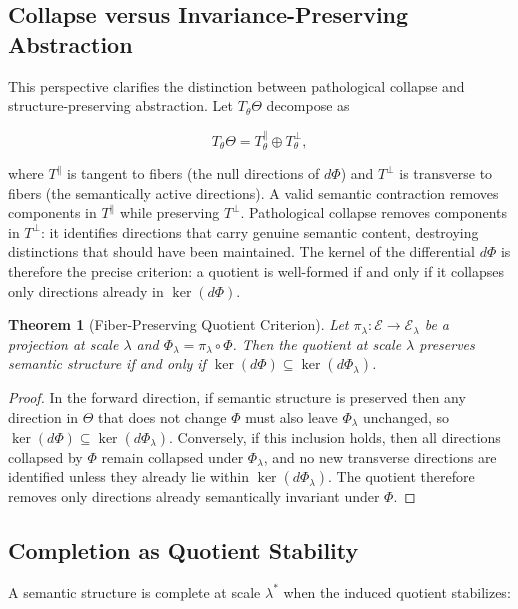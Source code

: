 \documentclass[11pt, twoside]{article}
\theoremstyle{plain}
\newtheorem{theorem}{Theorem}[section]
\theoremstyle{definition}
\theoremstyle{remark}
\begin{document}
\subsection{Collapse versus Invariance-Preserving Abstraction}

This perspective clarifies the distinction between pathological collapse and structure-preserving abstraction. Let $T_\theta \Theta$ decompose as

\[
T_\theta \Theta = T_\theta^{\parallel} \oplus T_\theta^{\perp},
\]

where $T^{\parallel}$ is tangent to fibers (the null directions of $d\Phi$) and $T^{\perp}$ is transverse to fibers (the semantically active directions). A valid semantic contraction removes components in $T^{\parallel}$ while preserving $T^{\perp}$. Pathological collapse removes components in $T^{\perp}$: it identifies directions that carry genuine semantic content, destroying distinctions that should have been maintained. The kernel of the differential $d\Phi$ is therefore the precise criterion: a quotient is well-formed if and only if it collapses only directions already in $\ker(d\Phi)$.

\begin{theorem}[Fiber-Preserving Quotient Criterion]
Let $\pi_\lambda : \mathcal{E} \to \mathcal{E}_\lambda$ be a projection at scale $\lambda$ and $\Phi_\lambda = \pi_\lambda \circ \Phi$. Then the quotient at scale $\lambda$ preserves semantic structure if and only if $\ker(d\Phi) \subseteq \ker(d\Phi_\lambda)$.
\end{theorem}

\begin{proof}
In the forward direction, if semantic structure is preserved then any direction in $\Theta$ that does not change $\Phi$ must also leave $\Phi_\lambda$ unchanged, so $\ker(d\Phi) \subseteq \ker(d\Phi_\lambda)$. Conversely, if this inclusion holds, then all directions collapsed by $\Phi$ remain collapsed under $\Phi_\lambda$, and no new transverse directions are identified unless they already lie within $\ker(d\Phi_\lambda)$. The quotient therefore removes only directions already semantically invariant under $\Phi$.
\end{proof}

\subsection{Completion as Quotient Stability}

A semantic structure is complete at scale $\lambda^*$ when the induced quotient stabilizes:
\end{document}
